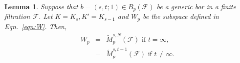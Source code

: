\documentclass[11pt]{amsart}
\theoremstyle{theorem}
\newtheorem{lemma}{Lemma}[section]
\theoremstyle{remark}
\theoremstyle{definition}
\begin{document}
\begin{lemma}
\label{lem:W}
    Suppose that $b=(s,t;1) \in B_p(\mathcal{F})$ be a generic bar in a finite filtration $\mathcal{F}$. 
    Let $K = K_s, K' = K_{s-1}$ and $W_p$ be the subspace defined in 
    Eqn.~\eqref{eqn:W}.
    Then,
    \begin{eqnarray*}
    W_p &=& 
    \widetilde{M}^{s,N}_p(\mathcal{F}) \text{ if $t = \infty$},\\
    &=& \widetilde{M}^{s,t-1}_p(\mathcal{F}) \text{ if $t \neq \infty$}.
    \end{eqnarray*}
\end{lemma}
\end{document}
